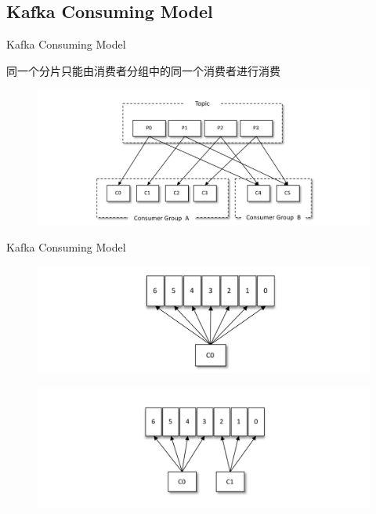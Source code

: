 \subsection{Kafka Consuming Model}
\begin{frame}[plain,t]{Kafka Consuming Model} %
	 \\  \vspace{2ex}
	
	同一个分片只能由消费者分组中的同一个消费者进行消费

	\begin{figure}
		\centering
		\includegraphics[width=0.9\linewidth]{image/0301}
		\label{fig:0301}
	\end{figure}
	
\end{frame}
\begin{frame}[plain,t]{Kafka Consuming Model} %
	 \\ 
	\begin{figure}
		\centering
		\includegraphics[width=0.9\linewidth]{image/0302}
		\label{fig:0302}
	\end{figure}
 \vspace{-4ex}
	\begin{figure}
		\centering
		\includegraphics[width=0.9\linewidth]{image/0303}
		\label{fig:0303}
	\end{figure}
\end{frame}
